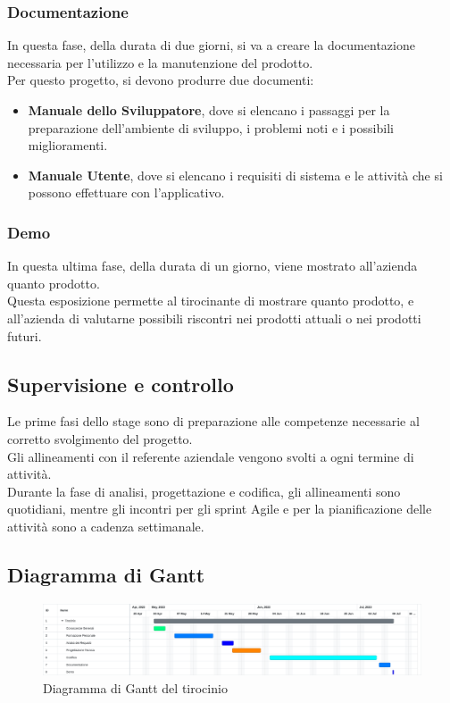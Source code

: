 \subsubsection{Documentazione}
In questa fase, della durata di due giorni, si va a creare la documentazione necessaria per l'utilizzo e la manutenzione del prodotto.\\
Per questo progetto, si devono produrre due documenti:
\begin{itemize}
    \item \textbf{Manuale dello Sviluppatore}, dove si elencano i passaggi per la preparazione dell'ambiente di sviluppo, i problemi noti e i possibili miglioramenti.
    \item \textbf{Manuale Utente}, dove si elencano i requisiti di sistema e le attività che si possono effettuare con l'applicativo.
\end{itemize}
\subsubsection{Demo}
In questa ultima fase, della durata di un giorno, viene mostrato all'azienda quanto prodotto.\\
Questa esposizione permette al tirocinante di mostrare quanto prodotto, e all'azienda di valutarne possibili riscontri nei prodotti attuali o nei prodotti futuri.

\subsection{Supervisione e controllo}
Le prime fasi dello stage sono di preparazione alle competenze necessarie al corretto svolgimento
del progetto.\\
Gli allineamenti con il referente aziendale vengono svolti a ogni termine di attività.\\
Durante la fase di analisi, progettazione e codifica, gli allineamenti sono quotidiani, mentre gli incontri per gli sprint Agile e per la pianificazione delle attività
sono a cadenza settimanale.
\subsection{Diagramma di Gantt}
\begin{figure}[!h] 
    \centering 
    \includegraphics[width=350pt]{images/diagrammaGantt.png} 
    \caption{Diagramma di Gantt del tirocinio}
\end{figure}
